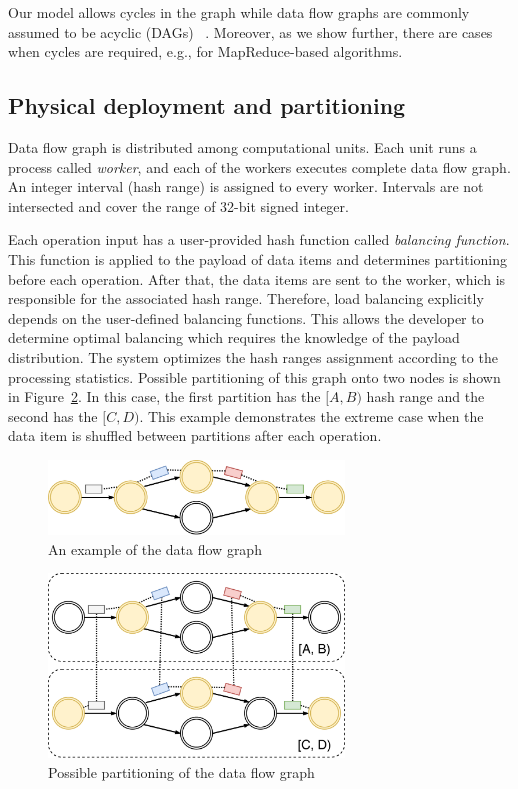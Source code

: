 Our model allows cycles in the graph while data flow graphs are commonly assumed to be acyclic (DAGs) 
~\cite{Zaharia:2016:ASU:3013530.2934664, Carbone:2017:SMA:3137765.3137777}. Moreover, as we show further, there are cases when cycles are required, e.g., for MapReduce-based algorithms. 

\subsection{Physical deployment and partitioning}
Data flow graph is distributed among computational units. Each unit runs a process called {\it worker}, and each of the workers executes complete data flow graph. An integer interval (hash range) is assigned to every worker. Intervals are not intersected and cover the range of 32-bit signed integer.

Each operation input has a user-provided hash function called {\it balancing function}. This function is applied to the payload of data items and determines partitioning before each operation. After that, the data items are sent to the worker, which is responsible for the associated hash range. Therefore, load balancing explicitly depends on the user-defined balancing functions. This allows the developer to determine optimal balancing which requires the knowledge of the payload distribution. The system optimizes the hash ranges assignment according to the processing statistics. Possible partitioning of this graph onto two nodes is shown in Figure~\ref{physical-graph-figure}. In this case, the first partition has the $[A, B)$ hash range and the second has the $[C, D)$. This example demonstrates the extreme case when the data item is shuffled between partitions after each operation.

\begin{figure}[htbp]
  \centering
  \includegraphics[width=0.70\textwidth]{pics/logical-graph}
  \caption{An example of the data flow graph}
  \label {logical-graph-figure}
\end{figure}

\begin{figure}[htbp]
  \centering
  \includegraphics[width=0.70\textwidth]{pics/physical-graph}
  \caption{Possible partitioning of the data flow graph}
  \label {physical-graph-figure}
\end{figure}

